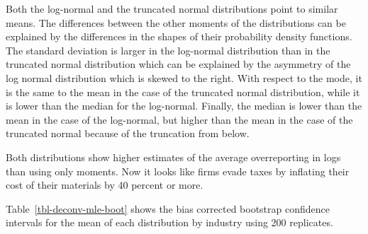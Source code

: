 \documentclass[
  12pt]{article}
\theoremstyle{definition}
\theoremstyle{remark}
\begin{document}
Both the log-normal and the truncated normal distributions point to
similar means. The differences between the other moments of the
distributions can be explained by the differences in the shapes of their
probability density functions. The standard deviation is larger in the
log-normal distribution than in the truncated normal distribution which
can be explained by the asymmetry of the log normal distribution which
is skewed to the right. With respect to the mode, it is the same to the
mean in the case of the truncated normal distribution, while it is lower
than the median for the log-normal. Finally, the median is lower than
the mean in the case of the log-normal, but higher than the mean in the
case of the truncated normal because of the truncation from below.

Both distributions show higher estimates of the average overreporting in
logs than using only moments. Now it looks like firms evade taxes by
inflating their cost of their materials by 40 percent or more.

Table~\ref{tbl-deconv-mle-boot} shows the bias corrected bootstrap
confidence intervals for the mean of each distribution by industry using
200 replicates.
\end{document}
